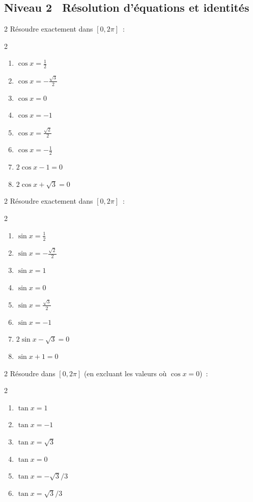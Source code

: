 \subsection*{\quad Niveau 2 \textemdash\ R\'esolution d'\'equations et identit\'es}

\begin{exo}[R\'esoudre $\cos x=a$ sur {$[0,2\pi]$} \corrige]{2}
R\'esoudre exactement dans $[0,2\pi]$~:
\begin{multicols}{2}
\begin{enumerate}
  \item $\cos x = \frac{1}{2}$
  \item $\cos x = -\frac{\sqrt{3}}{2}$
  \item $\cos x = 0$
  \item $\cos x = -1$
  \item $\cos x = \frac{\sqrt{2}}{2}$
  \item $\cos x = -\frac{1}{2}$
  \item $2\cos x - 1 = 0$
  \item $2\cos x + \sqrt{3} = 0$
\end{enumerate}
\end{multicols}
\end{exo}

\begin{exo}[R\'esoudre $\sin x=a$ sur {$[0,2\pi]$} \corrige]{2}
R\'esoudre exactement dans $[0,2\pi]$~:
\begin{multicols}{2}
\begin{enumerate}
  \item $\sin x = \frac{1}{2}$
  \item $\sin x = -\frac{\sqrt{2}}{2}$
  \item $\sin x = 1$
  \item $\sin x = 0$
  \item $\sin x = \frac{\sqrt{3}}{2}$
  \item $\sin x = -1$
  \item $2\sin x - \sqrt{3} = 0$
  \item $\sin x + 1 = 0$
\end{enumerate}
\end{multicols}
\end{exo}

\begin{exo}[R\'esoudre $\tan x=a$ sur {$[0,2\pi]$} \corrige]{2}
R\'esoudre dans $[0,2\pi]$ (en excluant les valeurs o\`u $\cos x=0$)~:
\begin{multicols}{2}
\begin{enumerate}
  \item $\tan x = 1$
  \item $\tan x = -1$
  \item $\tan x = \sqrt{3}$
  \item $\tan x = 0$
  \item $\tan x = -\sqrt{3}/3$
  \item $\tan x = \sqrt{3}/3$
\end{enumerate}
\end{multicols}
\end{exo}

